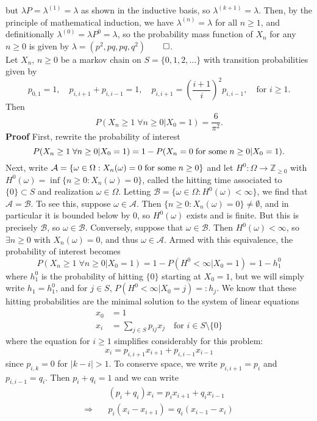 \documentclass[11pt, letterpaper]{article}
\newcommand{\mbb}[1]{\mathbb{#1}}
\newcommand{\mc}[1]{\mathcal{#1}}
\begin{document}
but $\lambda P=\lambda^{(1)}=\lambda$ as shown in the inductive basis, so $\lambda^{(k+1)}=\lambda$. Then, by the principle of
mathematical induction, we have $\lambda^{(n)}=\lambda$ for all $n\geq 1$, and definitionally $\lambda^{(0)}=\lambda P^0=\lambda$, so the
probability mass function of $X_n$ for any $n\geq 0$ is given by $\lambda=(p^2,pq,pq,q^2)$\hfill{$\qed$}.\\[10pt]
 Let $X_n$, $n\geq 0$ be a markov chain on $S=\{0,1,2,\dots\}$ with transition probabilities given by
\[p_{0,1}=1,\quad p_{i,i+1}+p_{i,i-1}=1,\quad p_{i,i+1}=\left(\frac{i+1}{i}\right)^2p_{i,i-1},\quad\text{for $i\geq 1$}.\]
Then
\[P(X_n\geq 1\;\forall n\geq 0|X_0=1)=\frac{6}{\pi^2}.\]
{\bf Proof} First, rewrite the probability of interest
\[P(X_n\geq 1\;\forall n\geq 0|X_0=1)=1-P(X_n=0\;\text{for some\;}n\geq 0|X_0=1).\]
Next, write $\mc{A}=\{\omega\in\Omega:X_n(\omega)=0\;\text{for some\;}n\geq 0\}$ and let $H^0:\Omega\rightarrow \mbb{Z}_{\geq 0}$ with $H^0(\omega)=\inf\{n\geq 0:X_n(\omega)=0\}$,
called the hitting time associated to $\{0\}\subset S$ and realization $\omega\in\Omega$. Letting $\mc{B}=\{\omega\in\Omega:H^0(\omega)<\infty\}$, we find that $\mc{A}=\mc{B}$. To see this, suppose $\omega\in\mc{A}$.
Then $\{n\geq 0: X_n(\omega)=0\}\neq\emptyset$, and in particular it is bounded below by $0$, so $H^0(\omega)$ exists and is finite. But this is precisely $\mc{B}$, so $\omega\in\mc{B}$.
Conversely, suppose that $\omega\in\mc{B}$. Then $H^0(\omega)<\infty$, so $\exists n\geq0$ with $X_n(\omega)=0$, and thus $\omega\in\mc{A}$. Armed with this equivalence, the probability of interest becomes
\[P(X_n\geq 1\;\forall n\geq 0|X_0=1)=1-P(H^0<\infty|X_0=1)=1-h_1^0\tag{3}\]
where $h_1^0$ is the probability of hitting $\{0\}$ starting at $X_0=1$, but we will simply write $h_1=h^0_1$, and for $j\in S$, $P(H^0<\infty|X_0=j)=:h_j$. We know that these hitting probabilities are the minimal solution to
the system of linear equations
\begin{align*}
    x_0&=1\\
    x_i&=\sum_{j\in S}p_{ij}x_j\quad\text{for $i\in S\setminus\{0\}$}
\end{align*}
where the equation for $i\geq 1$ simplifies considerably for this problem:
\[x_i=p_{i,i+1}x_{i+1}+p_{i,i-1}x_{i-1}\]
since $p_{i,k}=0$ for $|k-i|>1$. To conserve space, we write $p_{i,i+1}=p_i$ and $p_{i,i-1}=q_i$. Then $p_i+q_i=1$ and we can write
\begin{align*}
    &(p_i+q_i)x_i=p_ix_{i+1}+q_ix_{i-1}\\
    \Rightarrow\quad&p_i(x_i-x_{i+1})=q_i(x_{i-1}-x_i)
\end{align*}
\end{document}
